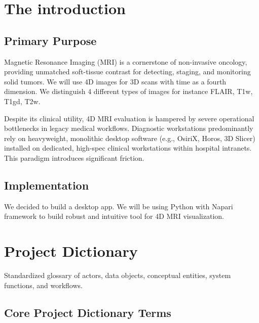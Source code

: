 \documentclass[11pt, a4paper]{article}
\begin{document}
\section{The introduction}

\subsection{Primary Purpose}

Magnetic Resonance Imaging (MRI) is a cornerstone of non-invasive oncology, providing unmatched soft-tissue contrast for detecting, staging, and monitoring solid tumors. We will use 4D images for 3D scans with time as a fourth dimension. We distinguish 4 different types of images for instance FLAIR, T1w, T1gd, T2w.

Despite its clinical utility, 4D MRI evaluation is hampered by severe operational bottlenecks in legacy medical workflows. Diagnostic workstations predominantly rely on heavyweight, monolithic desktop software (e.g., OsiriX, Horos, 3D Slicer) installed on dedicated, high-spec clinical workstations within hospital intranets. This paradigm introduces significant friction.

\subsection{Implementation}

We decided to build a desktop app. We will be using Python with Napari framework to build robust and intuitive tool for 4D MRI visualization.

\section{Project Dictionary}

Standardized glossary of actors, data objects, conceptual entities, system functions, and workflows.

\subsection{Core Project Dictionary Terms}
\end{document}

